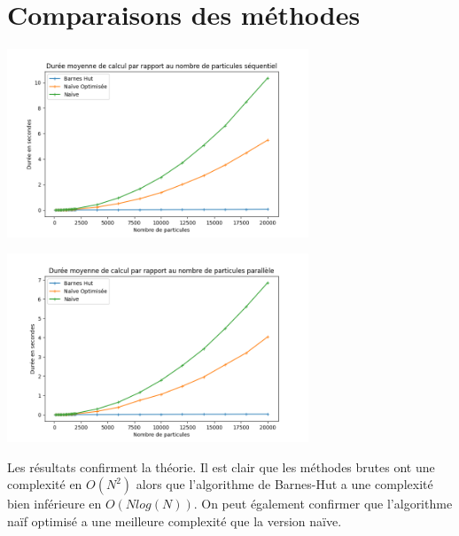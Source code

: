 \section{Comparaisons des méthodes}

\begin{minipage}[c]{.46\linewidth}
     \begin{center}
             \includegraphics[width=9cm]{./resultats/method_comparison_seq.png}
         \end{center}
   \end{minipage} \hfill
   \begin{minipage}[c]{.46\linewidth}
    \begin{center}
     \includegraphics[width=9cm]{./resultats/method_comparison_par.png}
        \end{center}
 \end{minipage}
 
 \begin{center}
 \captionsetup{hypcap=false}
\label{fig8*10}
 \end{center}

\par Les résultats confirment la théorie. Il est clair que les méthodes brutes ont une complexité en $O(N^2)$ alors que l'algorithme de Barnes-Hut a une complexité bien inférieure en $O(Nlog(N))$.
On peut également confirmer que l'algorithme naïf optimisé a une meilleure complexité que la version naïve.
 
